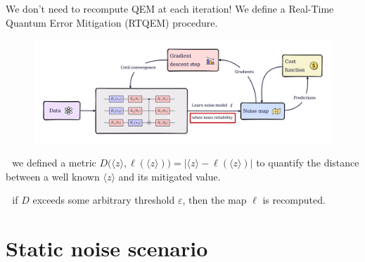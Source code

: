 \documentclass[8pt, xcolor={svgnames}, hyperref={linkcolor=black}]{beamer}
\begin{document}
\begin{frame}{We don't need to recompute QEM at each iteration!}
\vspace{0.16cm}
We define a Real-Time Quantum Error Mitigation (RTQEM) procedure.
\begin{figure}
    \includegraphics[width=1\textwidth]{figures/rtqem_epsilon.png}
\end{figure}
\pause
\faEdit\,\, we defined a metric $ D\bigl(\langle z \rangle, \ell(\langle z \rangle)\bigr) 
= |\langle z \rangle  - \ell(\langle z \rangle)|$
to quantify the distance between a well known $\langle z \rangle$ and its mitigated value.
\pause

\faAmbulance\,\, if $D$ exceeds some arbitrary threshold $\varepsilon$, then the
map $\ell$ is recomputed.
\end{frame}

\section{Static noise scenario}
\end{document}
